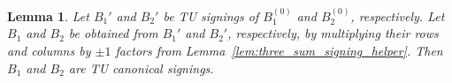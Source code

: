 \documentclass{article}
\newtheorem{lemma}{Lemma}
\theoremstyle{definition}
\begin{document}

\begin{lemma}\label{lem:canonical_signing_construction}
    Let $B_{1}'$ and $B_{2}'$ be TU signings of $B_{1}^{(0)}$ and $B_{2}^{(0)}$, respectively. Let $B_{1}$ and $B_{2}$ be obtained from $B_{1}'$ and $B_{2}'$, respectively, by multiplying their rows and columns by $\pm 1$ factors from Lemma~\ref{lem:three_sum_signing_helper}. Then $B_{1}$ and $B_{2}$ are TU canonical signings.
\end{lemma}
\end{document}
